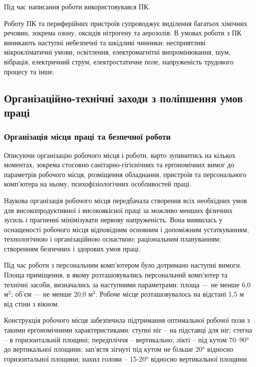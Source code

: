 Під час написання роботи використовувався ПК.

Роботу ПК та периферійних пристроїв супроводжує виділення багатьох хімічних речовин, зокрема озону, оксидів  нітрогену та аерозолів. В умовах роботи з ПК виникають наступні небезпечні та шкідливі чинники: несприятливі мікрокліматичні умови, освітлення, електромагнітні випромінювання, шум, вібрація, електричний струм, електростатичне поле, напруженість трудового процесу та інше.

\subsection{Організаційно-технічні заходи з поліпшення умов праці}

\subsubsection{Організація місця праці та безпечної роботи}

Описуючи організацію робочого місця і роботи, варто зупинитись на кількох моментах, зокрема стосовно санітарно-гігієнічних та ергономічних вимог до параметрів робочого місця, розміщення обладнання, пристроїв та персонального комп’ютера на ньому, психофізіологічних особливостей праці.

Наукова організація робочого місця передбачала створення всіх необхідних умов для високопродуктивної і високоякісної праці за можливо менших фізичних зусиль і прагненні мінімізувати нервову напруженість. Вона виявилась у оснащеності робочого місця відповідним основним і допоміжним устаткуванням, технологічною і організаційною оснасткою; раціональним плануванням; створенням безпечних і здорових умов праці.

Під час роботи з персональним комп’ютером було дотримано наступні вимоги.
Площа приміщення, в якому розташовувались персональний комп’ютер та технічні засоби, визначались за наступними параметрами: площа — не менше 6,0 м$^2$; об’єм — не менше 20,0 м$^3$. Робоче місце розташовувалось на відстані 1,5 м від стіни з вікном.

Конструкція робочого місця забезпечила підтримання оптимальної робочої пози з такими ергономічними характеристиками:  ступні ніг – на підставці для ніг; стегна – в горизонтальній площині; передпліччя –  вертикально;  лікті – під кутом 70–90° до вертикальної площини; зап’ястя зігнуті під кутом не більше 20° відносно горизонтальної площини; нахил голови – 15-20° відносно вертикальної площини.

